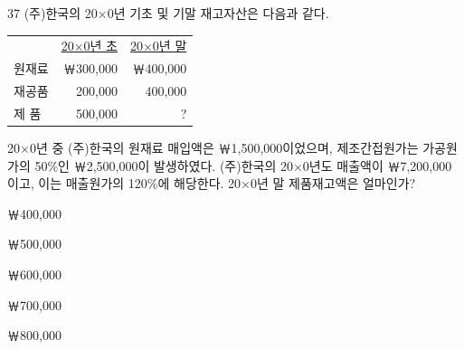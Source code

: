 \begin{question}{37}
(주)한국의 20×0년 기초 및 기말 재고자산은 다음과 같다.
\par
{\small\centering
\begin{tabular}{lrr}
\hline
 & \uline{20×0년 초} & \uline{20×0년 말} \\
원재료 & ￦300,000 & ￦400,000 \\
재공품 & 200,000 & 400,000 \\
제 품 & 500,000 & ? \\
\hline
\end{tabular}\par}
20×0년 중 (주)한국의 원재료 매입액은 ￦1,500,000이었으며, 제조간접원가는 가공원가의 50\%인 ￦2,500,000이 발생하였다. (주)한국의 20×0년도 매출액이 ￦7,200,000이고, 이는 매출원가의 120\%에 해당한다. 20×0년 말 제품재고액은 얼마인가? \par
\begin{choices}
  \item ￦400,000
  \item ￦500,000
  \item ￦600,000
  \item ￦700,000
  \item ￦800,000
\end{choices}
\end{question}
